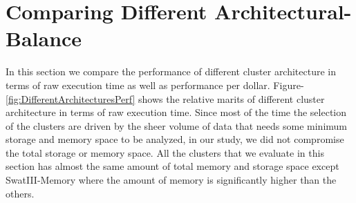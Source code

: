 \documentclass[conference]{IEEEtran}
\begin{document}
\section {Comparing Different Architectural-Balance} \label{ComparingDifferentArchitecturalBalance}
In this section we compare the performance of different cluster architecture in terms of raw execution time as well as performance per dollar.
Figure-\ref{fig:DifferentArchitecturesPerf} shows the relative marits of different cluster architecture in terms of raw execution time.
Since most of the time the selection of the clusters are driven by the sheer volume of data that needs some minimum storage and memory space to be analyzed, in our study, we did not compromise the total storage or memory space. All the clusters that we evaluate in this section has almost the same amount of total memory and storage space except SwatIII-Memory where the amount of memory is significantly higher than the others.
\end{document}
